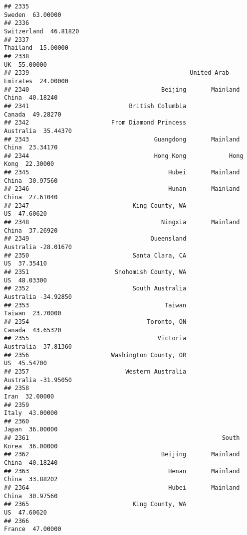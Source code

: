 \documentclass[
]{article}
\begin{document}
\begin{verbatim}
## 2335                                                           Sweden  63.00000
## 2336                                                      Switzerland  46.81820
## 2337                                                         Thailand  15.00000
## 2338                                                               UK  55.00000
## 2339                                             United Arab Emirates  24.00000
## 2340                                     Beijing       Mainland China  40.18240
## 2341                            British Columbia               Canada  49.28270
## 2342                       From Diamond Princess            Australia  35.44370
## 2343                                   Guangdong       Mainland China  23.34170
## 2344                                   Hong Kong            Hong Kong  22.30000
## 2345                                       Hubei       Mainland China  30.97560
## 2346                                       Hunan       Mainland China  27.61040
## 2347                             King County, WA                   US  47.60620
## 2348                                     Ningxia       Mainland China  37.26920
## 2349                                  Queensland            Australia -28.01670
## 2350                             Santa Clara, CA                   US  37.35410
## 2351                        Snohomish County, WA                   US  48.03300
## 2352                             South Australia            Australia -34.92850
## 2353                                      Taiwan               Taiwan  23.70000
## 2354                                 Toronto, ON               Canada  43.65320
## 2355                                    Victoria            Australia -37.81360
## 2356                       Washington County, OR                   US  45.54700
## 2357                           Western Australia            Australia -31.95050
## 2358                                                             Iran  32.00000
## 2359                                                            Italy  43.00000
## 2360                                                            Japan  36.00000
## 2361                                                      South Korea  36.00000
## 2362                                     Beijing       Mainland China  40.18240
## 2363                                       Henan       Mainland China  33.88202
## 2364                                       Hubei       Mainland China  30.97560
## 2365                             King County, WA                   US  47.60620
## 2366                                                           France  47.00000

\end{verbatim}
\end{document}
